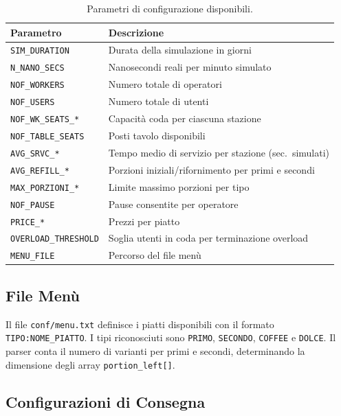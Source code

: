\documentclass[a4paper,12pt]{article}
\begin{document}
\begin{table}[H]
\centering
\caption{Parametri di configurazione disponibili.}
\small
\begin{tabular}{@{}lp{8cm}@{}}
\toprule
\textbf{Parametro} & \textbf{Descrizione} \\
\midrule
\texttt{SIM\_DURATION}       & Durata della simulazione in giorni \\
\texttt{N\_NANO\_SECS}       & Nanosecondi reali per minuto simulato \\
\texttt{NOF\_WORKERS}        & Numero totale di operatori \\
\texttt{NOF\_USERS}          & Numero totale di utenti \\
\texttt{NOF\_WK\_SEATS\_*}   & Capacità coda per ciascuna stazione \\
\texttt{NOF\_TABLE\_SEATS}   & Posti tavolo disponibili \\
\texttt{AVG\_SRVC\_*}        & Tempo medio di servizio per stazione (sec.\ simulati) \\
\texttt{AVG\_REFILL\_*}      & Porzioni iniziali/rifornimento per primi e secondi \\
\texttt{MAX\_PORZIONI\_*}    & Limite massimo porzioni per tipo \\
\texttt{NOF\_PAUSE}          & Pause consentite per operatore \\
\texttt{PRICE\_*}            & Prezzi per piatto \\
\texttt{OVERLOAD\_THRESHOLD} & Soglia utenti in coda per terminazione overload \\
\texttt{MENU\_FILE}          & Percorso del file menù \\
\bottomrule
\end{tabular}
\end{table}

\subsection{File Menù}

Il file \texttt{conf/menu.txt} definisce i piatti disponibili con il
formato \texttt{TIPO:NOME\_PIATTO}. I tipi riconosciuti sono
\texttt{PRIMO}, \texttt{SECONDO}, \texttt{COFFEE} e \texttt{DOLCE}.
Il parser conta il numero di varianti per primi e secondi, determinando
la dimensione degli array \texttt{portion\_left[]}.

\subsection{Configurazioni di Consegna}
\end{document}
